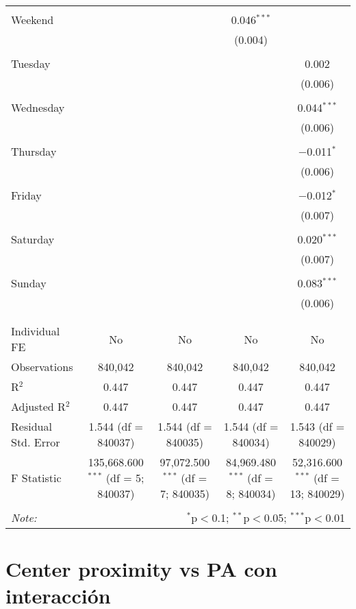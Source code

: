 \documentclass[
]{article}
\begin{document}
\begin{table}[!htbp]
{\begin{tabular}{@{\extracolsep{5pt}}lcccc}
  & & & & \\ 
 Weekend &  &  & 0.046$^{***}$ &  \\ 
  &  &  & (0.004) &  \\ 
  & & & & \\ 
 Tuesday &  &  &  & 0.002 \\ 
  &  &  &  & (0.006) \\ 
  & & & & \\ 
 Wednesday &  &  &  & 0.044$^{***}$ \\ 
  &  &  &  & (0.006) \\ 
  & & & & \\ 
 Thursday &  &  &  & $-$0.011$^{*}$ \\ 
  &  &  &  & (0.006) \\ 
  & & & & \\ 
 Friday &  &  &  & $-$0.012$^{*}$ \\ 
  &  &  &  & (0.007) \\ 
  & & & & \\ 
 Saturday &  &  &  & 0.020$^{***}$ \\ 
  &  &  &  & (0.007) \\ 
  & & & & \\ 
 Sunday &  &  &  & 0.083$^{***}$ \\ 
  &  &  &  & (0.006) \\ 
  & & & & \\ 
\hline \\[-1.8ex] 
Individual FE & No & No & No & No \\ 
Observations & 840,042 & 840,042 & 840,042 & 840,042 \\ 
R$^{2}$ & 0.447 & 0.447 & 0.447 & 0.447 \\ 
Adjusted R$^{2}$ & 0.447 & 0.447 & 0.447 & 0.447 \\ 
Residual Std. Error & 1.544 (df = 840037) & 1.544 (df = 840035) & 1.544 (df = 840034) & 1.543 (df = 840029) \\ 
F Statistic & 135,668.600$^{***}$ (df = 5; 840037) & 97,072.500$^{***}$ (df = 7; 840035) & 84,969.480$^{***}$ (df = 8; 840034) & 52,316.600$^{***}$ (df = 13; 840029) \\ 
\hline 
\hline \\[-1.8ex] 
\textit{Note:}  & \multicolumn{4}{r}{$^{*}$p$<$0.1; $^{**}$p$<$0.05; $^{***}$p$<$0.01} \\ 
\end{tabular}
} 
\end{table} 
\newpage
\section{Center proximity vs PA con interacción}
\end{document}
